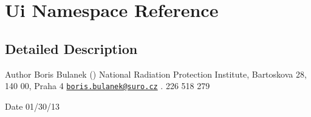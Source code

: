 \hypertarget{namespaceUi}{\section{Ui Namespace Reference}
\label{namespaceUi}
}


\subsection{Detailed Description}
\begin{DoxyAuthor}{Author}
Boris Bulanek ()  National Radiation Protection Institute, Bartoskova 28, 140 00, Praha 4  \href{mailto:boris.bulanek@suro.cz}{\tt boris.\+bulanek@suro.\+cz} . 226 518 279 
\end{DoxyAuthor}
\begin{DoxyDate}{Date}
01/30/13 
\end{DoxyDate}
